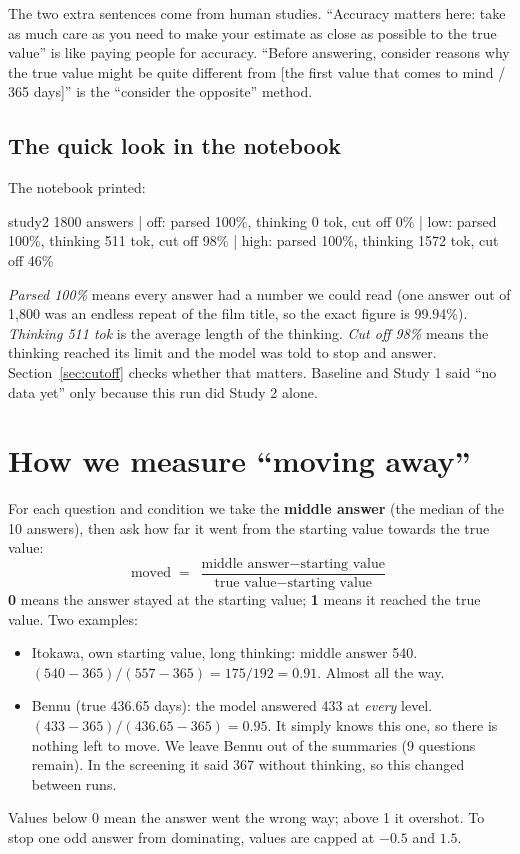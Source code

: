 \documentclass[11pt,a4paper]{article}
\begin{document}
The two extra sentences come from human studies. ``Accuracy matters here: take as much care as you need to make your estimate as close as possible to the true value'' is like paying people for accuracy. ``Before answering, consider reasons why the true value might be quite different from {[the first value that comes to mind / 365 days]}'' is the ``consider the opposite'' method.

\subsection*{The quick look in the notebook}

The notebook printed:
\begin{transcript}[]
\ttfamily\footnotesize study2  1800 answers | off: parsed 100\%, thinking 0 tok, cut off 0\% | low: parsed 100\%, thinking 511 tok, cut off 98\% | high: parsed 100\%, thinking 1572 tok, cut off 46\%
\end{transcript}
\emph{Parsed 100\%} means every answer had a number we could read (one answer out of 1,800 was an endless repeat of the film title, so the exact figure is 99.94\%). \emph{Thinking 511 tok} is the average length of the thinking. \emph{Cut off 98\%} means the thinking reached its limit and the model was told to stop and answer. Section~\ref{sec:cutoff} checks whether that matters. Baseline and Study 1 said ``no data yet'' only because this run did Study 2 alone.

\section{How we measure ``moving away''}

For each question and condition we take the \textbf{middle answer} (the median of the 10 answers), then ask how far it went from the starting value towards the true value:
\[
\text{moved} \;=\; \frac{\text{middle answer} - \text{starting value}}{\text{true value} - \text{starting value}}
\]
\textbf{0} means the answer stayed at the starting value; \textbf{1} means it reached the true value. Two examples:
\begin{itemize}
  \item Itokawa, own starting value, long thinking: middle answer 540. $(540-365)/(557-365) = 175/192 = 0.91$. Almost all the way.
  \item Bennu (true 436.65 days): the model answered 433 at \emph{every} level. $(433-365)/(436.65-365) = 0.95$. It simply knows this one, so there is nothing left to move. We leave Bennu out of the summaries (9 questions remain). In the screening it said 367 without thinking, so this changed between runs.
\end{itemize}
Values below 0 mean the answer went the wrong way; above 1 it overshot. To stop one odd answer from dominating, values are capped at $-0.5$ and $1.5$.
\end{document}

